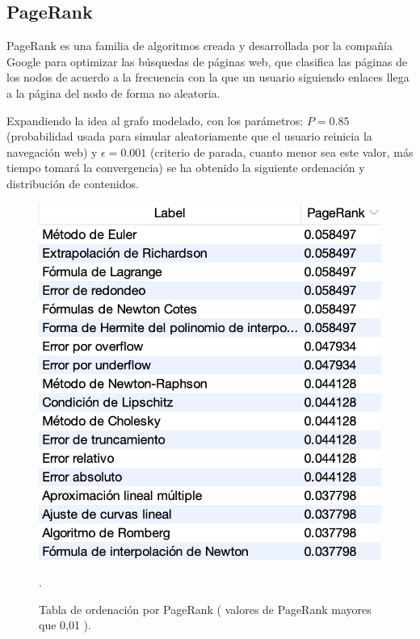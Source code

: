 \documentclass[a4paper,10pt,twocolumn]{article}
\begin{document}
        \subsection{PageRank}

        PageRank es una familia de algoritmos creada y desarrollada por la compañía Google para optimizar las búsquedas de páginas web, que clasifica las páginas de los nodos de acuerdo a la frecuencia con la que un usuario siguiendo enlaces llega a la página del nodo de forma no aleatoria. 

        Expandiendo la idea al grafo modelado, con los parámetros: $P = 0.85$ (probabilidad usada para simular aleatoriamente que el usuario reinicia la navegación web) y $\epsilon = 0.001$ (criterio de parada, cuanto menor sea este valor, más tiempo tomará la convergencia) se ha obtenido la siguiente ordenación y distribución de contenidos.

        
        \begin{figure}[h!]
            \centering
            \includegraphics[scale=0.35]{pagerank_order.png}
            \caption{Tabla de ordenación por PageRank ( valores de PageRank mayores que 0,01 ). \label{fig:ex}}
.        \end{figure}
\end{document}
